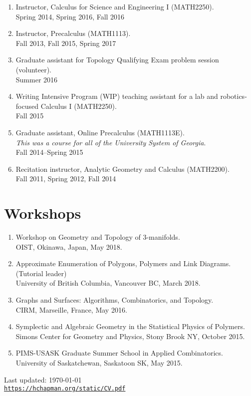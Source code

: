 \documentclass[letterpaper]{article}
\def\footerlink{https://hchapman.org/static/CV.pdf}
\renewenvironment{itemize}{
  \begin{list}{}{
    \setlength{\leftmargin}{1.5em}
  }
}{
  \end{list}
}
\begin{document}
\begin{enumerate}
\item Instructor, Calculus for Science and Engineering I (MATH2250). \\
  Spring 2014, Spring 2016, Fall 2016
\item Instructor, Precalculus (MATH1113). \\
  Fall 2013, Fall 2015, Spring 2017
\item Graduate assistant for Topology Qualifying Exam problem session
  (volunteer). \\
  Summer 2016
\item Writing Intensive Program (WIP) teaching assistant for a lab and
  robotics-focused Calculus I (MATH2250). \\
  Fall 2015
\item Graduate assistant, Online Precalculus (MATH1113E). \\
  \emph{This was a course for all of the University System of Georgia}.\\
  Fall 2014--Spring 2015
\item Recitation instructor, Analytic Geometry and Calculus
  (MATH2200).\\
  Fall 2011, Spring 2012, Fall 2014

\end{enumerate}

\section*{Workshops}
\begin{enumerate}
\item Workshop on Geometry and Topology of 3-manifolds. \\
  OIST, Okinawa, Japan, May 2018.
\item Approximate Enumeration of Polygons, Polymers and Link Diagrams. (Tutorial leader) \\
  University of British Columbia, Vancouver BC, March 2018.
\item Graphs and Surfaces: Algorithms, Combinatorics, and Topology. \\
  CIRM, Marseille, France, May 2016.
\item Symplectic and Algebraic Geometry in the Statistical Physics of Polymers. \\
  Simons Center for Geometry and Physics, Stony Brook NY, October 2015. 
\item PIMS-USASK Graduate Summer School in Applied Combinatorics. \\
  University of Saskatchewan, Saskatoon SK, May 2015.
\end{enumerate}

\bigskip

\begin{center}
  \begin{footnotesize}
    Last updated: \today \\
    \href{\footerlink}{\texttt{\footerlink}}
  \end{footnotesize}
\end{center}
\end{document}
